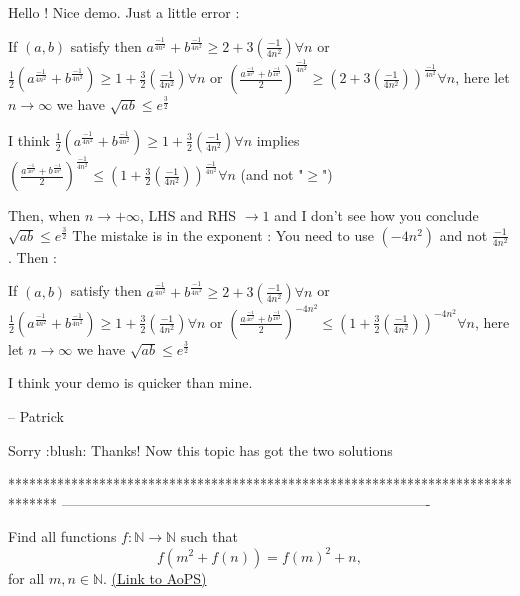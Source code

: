 \begin{mysolution}
	Hello !
Nice demo.
Just a little error :


\begin{tcolorbox}
If $(a,b)$ satisfy then $a^{\frac{-1}{4n^{2}}}+b^{\frac{-1}{4n^{2}}}\geq 2+3(\frac{-1}{4n^{2}})\forall n$ or $\frac{1}{2}(a^{\frac{-1}{4n^{2}}}+b^{\frac{-1}{4n^{2}}})\geq 1+\frac{3}{2}(\frac{-1}{4n^{2}})\forall n$ or $(\frac{a^{\frac{-1}{4n^{2}}}+b^{\frac{-1}{4n^{2}}}}{2})^{\frac{-1}{4n^{2}}}\geq (2+3(\frac{-1}{4n^{2}}))^{\frac{-1}{4n^{2}}}\forall n$, here let $n\to \infty$ we have $\sqrt{ab}\leq e^{\frac{3}{2}}$\end{tcolorbox}

I think $\frac{1}{2}(a^{\frac{-1}{4n^{2}}}+b^{\frac{-1}{4n^{2}}})\geq 1+\frac{3}{2}(\frac{-1}{4n^{2}})\forall n$ implies $(\frac{a^{\frac{-1}{4n^{2}}}+b^{\frac{-1}{4n^{2}}}}{2})^{\frac{-1}{4n^{2}}}\leq (1+\frac{3}{2}(\frac{-1}{4n^{2}}))^{\frac{-1}{4n^{2}}}\forall n$ (and not "$\geq$")

Then, when $n\rightarrow+\infty$, LHS and RHS $\rightarrow 1$ and I don't see how you conclude  $\sqrt{ab}\leq e^{\frac{3}{2}}$
The mistake is in the exponent : You need to use $(-4n^{2})$ and not $\frac{-1}{4n^{2}}$. Then :


If $(a,b)$ satisfy then $a^{\frac{-1}{4n^{2}}}+b^{\frac{-1}{4n^{2}}}\geq 2+3(\frac{-1}{4n^{2}})\forall n$ or $\frac{1}{2}(a^{\frac{-1}{4n^{2}}}+b^{\frac{-1}{4n^{2}}})\geq 1+\frac{3}{2}(\frac{-1}{4n^{2}})\forall n$ or $(\frac{a^{\frac{-1}{4n^{2}}}+b^{\frac{-1}{4n^{2}}}}{2})^{-4n^{2}}\leq (1+\frac{3}{2}(\frac{-1}{4n^{2}}))^{-4n^{2}}\forall n$, here let $n\to \infty$ we have $\sqrt{ab}\leq e^{\frac{3}{2}}$

I think your demo is quicker than mine.

-- 
Patrick
\end{mysolution}



\begin{mysolution}
	Sorry  :blush: Thanks! Now this topic has got the two solutions  
\end{mysolution}
*******************************************************************************
-------------------------------------------------------------------------------

\begin{problem}
	Find all functions $f: \mathbb N \to \mathbb N$ such that
\[f(m^{2}+f(n))=f(m)^{2}+n,\]
for all $m, n \in \mathbb N$.
	\flushright \href{https://artofproblemsolving.com/community/c6h145161}{(Link to AoPS)}
\end{problem}



